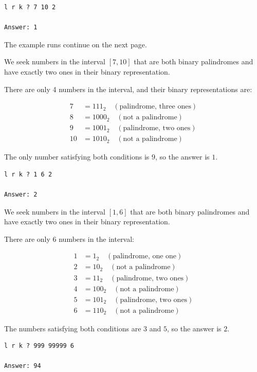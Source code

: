 \vspace{2cm}

\begin{verbatim}
l r k ? 7 10 2

Answer: 1
\end{verbatim}

\vspace{1cm}

\begin{center}
{\LARGE The example runs continue on the next page.}
\end{center}

\newpage

We seek numbers in the interval $[7, 10]$ that are both binary palindromes and have exactly two ones in their binary representation.

There are only 4 numbers in the interval, and their binary representations are:

\begin{align*}
7 &= 111_2 \quad (\text{palindrome, three ones}) \\
8 &= 1000_2 \quad (\text{not a palindrome}) \\
9 &= 1001_2 \quad (\text{palindrome, two ones}) \\
10 &= 1010_2 \quad (\text{not a palindrome})
\end{align*}

The only number satisfying both conditions is $9$, so the answer is $1$.

\vspace{1cm}

\begin{verbatim}
l r k ? 1 6 2

Answer: 2
\end{verbatim}
We seek numbers in the interval $[1, 6]$ that are both binary palindromes and have exactly two ones in their binary representation.

There are only 6 numbers in the interval:

\begin{align*}
1 &= 1_2 \quad (\text{palindrome, one one}) \\
2 &= 10_2 \quad (\text{not a palindrome}) \\
3 &= 11_2 \quad (\text{palindrome, two ones}) \\
4 &= 100_2 \quad (\text{not a palindrome}) \\
5 &= 101_2 \quad (\text{palindrome, two ones}) \\
6 &= 110_2 \quad (\text{not a palindrome})
\end{align*}

The numbers satisfying both conditions are $3$ and $5$, so the answer is $2$.

\vspace{1cm}

\begin{verbatim}
l r k ? 999 99999 6

Answer: 94
\end{verbatim}





